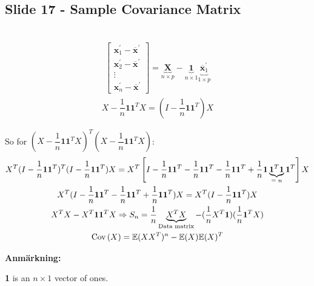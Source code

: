 \subsection{Slide 17 - Sample Covariance Matrix}\hfill\\
\begin{equation*}
  \begin{gathered}
    \begin{bmatrix}\mathbf{x}_1^{\prime}-\mathbf{\overline{x}}^{\prime}\\\mathbf{x}_2^{\prime}-\mathbf{\overline{x}}^{\prime}\\\vdots\\\mathbf{x}_n^{\prime}-\mathbf{\overline{x}}^{\prime}\end{bmatrix} = \underbrace{\mathbf{X}}_{n\times p}-\underbrace{\mathbf{1}}_{n\times1}\underbrace{\mathbf{\overline{x}}_1^{\prime}}_{1\times p}
  \end{gathered}
\end{equation*}
\begin{equation*}
  \begin{gathered}
    X-\dfrac{1}{n}\mathbf{1}\mathbf{1}^TX = (I-\dfrac{1}{n}\mathbf{1}\mathbf{1}^T)X
  \end{gathered}
\end{equation*}\par
\noindent So for $(X-\dfrac{1}{n}\mathbf{1}\mathbf{1}^TX)^T(X-\dfrac{1}{n}\mathbf{1}\mathbf{1}^TX)$:
\begin{equation*}
  \begin{gathered}
    X^T(I-\dfrac{1}{n}\mathbf{1}\mathbf{1}^T)^T(I-\dfrac{1}{n}\mathbf{1}\mathbf{1}^T)X = X^T\left[I-\dfrac{1}{n}\mathbf{1}\mathbf{1}^T-\dfrac{1}{n}\mathbf{1}\mathbf{1}^T-\dfrac{1}{n}\mathbf{1}\mathbf{1}^T+\dfrac{1}{n}\mathbf{1}\underbrace{\mathbf{1}^T\mathbf{1}}_{\text{$=n$}}\mathbf{1}^T\right]X\\
    X^T(I-\dfrac{1}{n}\mathbf{1}\mathbf{1}^T-\dfrac{1}{n}\mathbf{1}\mathbf{1}^T+\dfrac{1}{n}\mathbf{1}\mathbf{1}^T)X = X^T(I-\dfrac{1}{n}\mathbf{1}\mathbf{1}^T)X\\
    X^TX-X^T\mathbf{1}\mathbf{1}^TX\Rightarrow S_n = \dfrac{1}{n}\underbrace{X^TX}_{\text{Data matrix}}-(\dfrac{1}{n}X^T\mathbf{1})(\dfrac{1}{n}\mathbf{1}^TX)\\
    \text{Cov}\left(X\right) = \mathbb{E}(XX^T)^n-\mathbb{E}(X)\mathbb{E}(X)^T
  \end{gathered}
\end{equation*}
\par\bigskip
\noindent\textbf{Anmärkning:}\par
\noindent\textbf{1} is an $n\times 1$ vector of ones.
